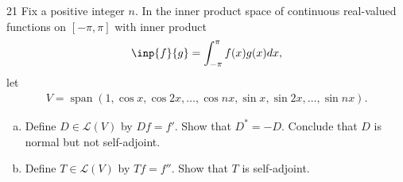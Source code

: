 \documentclass{extarticle}
\newenvironment{problem}[1]{\begin{prob*}{#1}{}}{\end{prob*}}
\DeclareMathOperator{\Span}{span}
\newcommand{\Hom}{\mathcal{L}}
\begin{document}
\begin{problem}{21}
Fix a positive integer $n$.  In the inner product space of continuous real-valued functions on $[-\pi, \pi]$ with inner product
\begin{align*}
\inp{f}{g} = \int_{-\pi}^\pi f(x)g(x)dx,
\end{align*}
let 
\begin{align*}
V = \Span(1, \cos x, \cos 2x, \dots, \cos nx, \sin x, \sin 2x, \dots, \sin nx).
\end{align*}
\begin{enumerate}[(a)]
\item Define $D\in\Hom(V)$ by $Df = f'$.  Show that $D^\ast = -D$.  Conclude that $D$ is normal but not self-adjoint.
\item Define $T\in\Hom(V)$ by $Tf = f''$.  Show that $T$ is self-adjoint.
\end{enumerate}
\end{problem}
\end{document}
